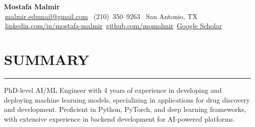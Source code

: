 \documentclass[9pt,letterpaper]{extarticle}
\newcommand{\sectionsep}{%
  \par
  \vspace{-3ex}%
  \noindent\rule{\textwidth}{0.4pt}%
  \vspace{0ex}%
  \par
}
\begin{document}
\begin{center}
  {\LARGE\bfseries Mostafa Malmir}\\[0.5ex]
  {\small
    \faEnvelope\,\href{mailto:malmir.edumail@gmail.com}{malmir.edumail@gmail.com} \quad
    \faPhone\, (210)~350--9263 \quad
    \faMapMarker\, San Antonio, TX\\
    \faLinkedin\,\href{https://www.linkedin.com/in/mostafa-malmir/}{linkedin.com/in/mostafa-malmir} \quad
    \faGithub\,\href{https://github.com/momalmir}{github.com/momalmir} \quad
    \faGraduationCap\,\href{https://scholar.google.com/citations?user=GZ4wP8YAAAAJ&hl=en}{Google Scholar}
  }
\end{center}

\section*{SUMMARY}
\sectionsep
PhD-level AI/ML Engineer with 4 years of experience in developing and deploying machine learning models, specializing in applications for drug discovery and development. Proficient in Python, PyTorch, and deep learning frameworks, with extensive experience in backend development for AI-powered platforms.

\end{document}
